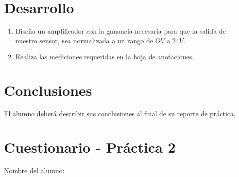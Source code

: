 
\section{Desarrollo}

	\begin{enumerate}
		\item Diseña un amplificador con la ganancia necesaria para que la salida de nuestro sensor, sea normalizada a un rango de $OV$ a $24V$.
		\item Realiza las mediciones requeridas en la hoja de anotaciones.
	\end{enumerate}


\section{Conclusiones}

	El alumno deberá describir sus conclusiones al final de su reporte de práctica.

\begin{center}
	\huge \textthing
\end{center}


\clearpage
\section{Cuestionario - Práctica 2}
	Nombre del alumno: \\[0.2cm]
	\horrule{0.5pt} \\[0.2cm] %

